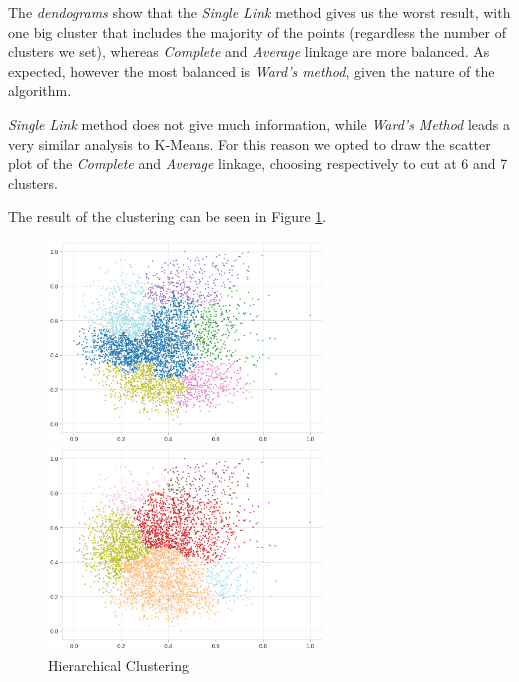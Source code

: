 \documentclass[a4paper,11pt,dvipsnames]{article}
\begin{document}
The \textit{dendograms} show that the \textit{Single Link} method gives us the worst result, with one big cluster that includes the majority of the points (regardless the number of clusters we set), whereas \textit{Complete} and \textit{Average} linkage are more balanced. As expected, however the most balanced is \textit{Ward's method}, given the nature of the algorithm. 
 
 \textit{Single Link} method does not give much information, while \textit{Ward's Method} leads a very similar analysis to K-Means. For this reason we opted to draw the scatter plot of the \textit{Complete} and \textit{Average} linkage, choosing respectively to cut at 6 and 7 clusters.
 
 The result of the clustering can be seen in Figure \ref{fig:hierach}.
 
\begin{figure}[h]
    \centering
    \begin{minipage}{0.49\textwidth}
    \centering
        \includegraphics[width=0.65\textwidth]{complete.png}
    \end{minipage}
    \hfill
        \begin{minipage}{0.49\textwidth}
        \centering
        \includegraphics[width=0.65\textwidth]{average.png}
    \end{minipage}
    \caption{Hierarchical Clustering}
    \label{fig:hierach}
\end{figure}
\end{document}
